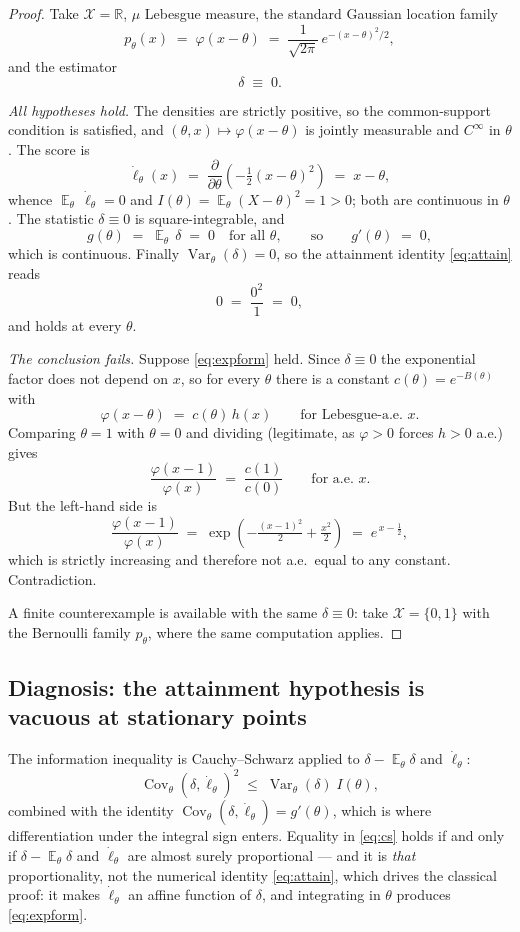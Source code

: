 \documentclass[11pt]{article}
\theoremstyle{plain}
\theoremstyle{definition}
\theoremstyle{remark}
\DeclareMathOperator{\Var}{Var}
\DeclareMathOperator{\Cov}{Cov}
\DeclareMathOperator{\E}{\mathbb{E}}
\newcommand{\R}{\mathbb{R}}
\newcommand{\X}{\mathcal{X}}
\newcommand{\score}{\dot\ell_\theta}
\begin{document}
\begin{proof}
Take $\X=\R$, $\mu$ Lebesgue measure, the standard Gaussian location family
\[
  p_\theta(x) \;=\; \varphi(x-\theta) \;=\; \frac{1}{\sqrt{2\pi}}\,e^{-(x-\theta)^2/2},
\]
and the estimator
\[
  \delta \;\equiv\; 0 .
\]

\emph{All hypotheses hold.} The densities are strictly positive, so the common-support
condition is satisfied, and $(\theta,x)\mapsto\varphi(x-\theta)$ is jointly measurable and
$C^\infty$ in $\theta$. The score is
\[
  \score(x) \;=\; \frac{\partial}{\partial\theta}\left(-\tfrac{1}{2}(x-\theta)^2\right)
  \;=\; x-\theta,
\]
whence $\E_\theta\,\score = 0$ and $I(\theta)=\E_\theta (X-\theta)^2 = 1 > 0$; both are
continuous in $\theta$. The statistic $\delta\equiv 0$ is square-integrable, and
\[
  g(\theta) \;=\; \E_\theta\,\delta \;=\; 0 \quad\text{for all }\theta,
  \qquad\text{so}\qquad g'(\theta)\;=\;0,
\]
which is continuous. Finally $\Var_\theta(\delta)=0$, so the attainment identity
\eqref{eq:attain} reads
\[
  0 \;=\; \frac{0^2}{1} \;=\; 0 ,
\]
and holds at every $\theta$.

\emph{The conclusion fails.} Suppose \eqref{eq:expform} held. Since $\delta\equiv 0$ the
exponential factor does not depend on $x$, so for every $\theta$ there is a constant
$c(\theta) = e^{-B(\theta)}$ with
\[
  \varphi(x-\theta) \;=\; c(\theta)\,h(x) \qquad\text{for Lebesgue-a.e.\ }x .
\]
Comparing $\theta=1$ with $\theta=0$ and dividing (legitimate, as $\varphi>0$ forces
$h>0$ a.e.) gives
\[
  \frac{\varphi(x-1)}{\varphi(x)} \;=\; \frac{c(1)}{c(0)}
  \qquad\text{for a.e.\ }x .
\]
But the left-hand side is
\[
  \frac{\varphi(x-1)}{\varphi(x)}
  \;=\; \exp\!\left(-\tfrac{(x-1)^2}{2}+\tfrac{x^2}{2}\right)
  \;=\; e^{\,x-\frac12},
\]
which is strictly increasing and therefore not a.e.\ equal to any constant. Contradiction.

A finite counterexample is available with the same $\delta\equiv 0$: take
$\X=\{0,1\}$ with the Bernoulli family $p_\theta$, where the same computation applies.
\end{proof}

\subsection{Diagnosis: the attainment hypothesis is vacuous at stationary points}

The information inequality is Cauchy--Schwarz applied to $\delta-\E_\theta\delta$ and
$\score$:
\begin{equation}\label{eq:cs}
  \Cov_\theta(\delta,\score)^2 \;\le\; \Var_\theta(\delta)\; I(\theta),
\end{equation}
combined with the identity $\Cov_\theta(\delta,\score)=g'(\theta)$, which is where
differentiation under the integral sign enters. Equality in \eqref{eq:cs} holds if and only
if $\delta-\E_\theta\delta$ and $\score$ are almost surely proportional --- and it is
\emph{that} proportionality, not the numerical identity \eqref{eq:attain}, which drives the
classical proof: it makes $\score$ an affine function of $\delta$, and integrating in
$\theta$ produces \eqref{eq:expform}.
\end{document}
